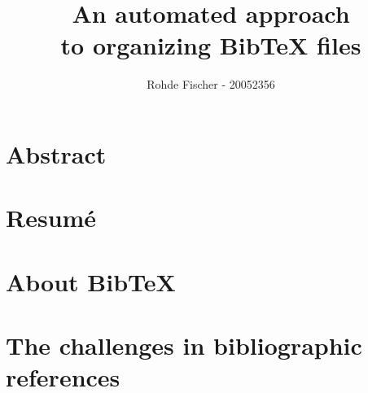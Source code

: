\documentclass[twoside,11pt,openright,a4paper]{report}
\newcommand{\bibtex}{Bib{\TeX}}
\begin{document}
\pagestyle{empty}
\begin{titlepage}
\author{Rohde Fischer - 20052356}
\title{An automated approach\\to organizing {\bibtex} files}
\maketitle

\end{titlepage}


\pagestyle{plain}
\setcounter{page}{1}

\chapter*{Abstract}

\chapter*{Resum\'e}


%
%
%
\tableofcontents

\setcounter{secnumdepth}{2}


\chapter{About Bib{\TeX}}
\label{ch:about}



\chapter{The challenges in bibliographic references}
\label{ch:problem-description}
\end{document}
